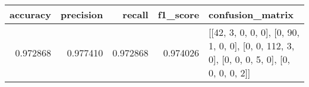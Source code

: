 \begin{tabular}{rrrrl}
\toprule
accuracy & precision & recall & f1_score & confusion_matrix \\
\midrule
0.972868 & 0.977410 & 0.972868 & 0.974026 & [[42, 3, 0, 0, 0], [0, 90, 1, 0, 0], [0, 0, 112, 3, 0], [0, 0, 0, 5, 0], [0, 0, 0, 0, 2]] \\
\bottomrule
\end{tabular}
